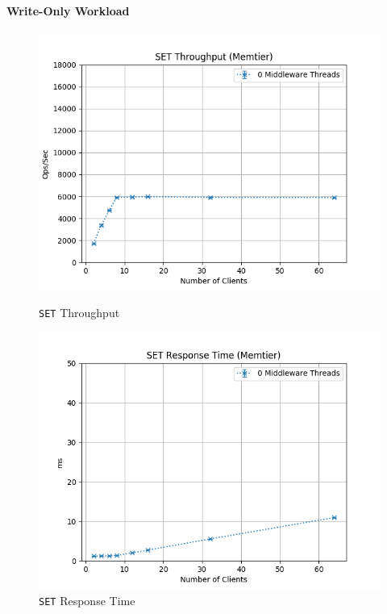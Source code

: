 \documentclass[11pt,a4paper]{article}
\begin{document}
\paragraph{Write-Only Workload}
%
\begin{figure}[H]
	\centering
	\captionsetup{width=0.4\textwidth}
    \begin{minipage}{0.5\textwidth}
        \centering
        \includegraphics[width=\textwidth]{../illustrations/plots/1_2_two_servers/1-0/memtier_set_tp_s.png}
        \caption{\texttt{SET} Throughput}
        \label{fig:two_servers_set_tp}
    \end{minipage}\hfill
    \begin{minipage}{0.5\textwidth}
        \centering
        \includegraphics[width=\textwidth]{../illustrations/plots/1_2_two_servers/1-0/memtier_set_rt_ms.png}
        \caption{\texttt{SET} Response Time}
        \label{fig:two_servers_set_rt}
    \end{minipage}
\end{figure}
\end{document}
